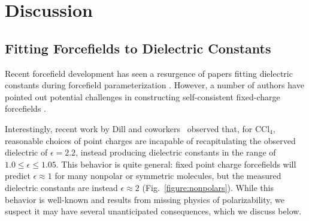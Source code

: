 \documentclass[aps,pre,twocolumn,nofootinbib,superscriptaddress,linenumbers]{revtex4-1}
\begin{document}

\section{Discussion}


\subsection{Fitting Forcefields to Dielectric Constants}

Recent forcefield development has seen a resurgence of papers fitting dielectric constants during forcefield parameterization \cite{wang2014building, fennell2014fixed}.  
However, a number of authors have pointed out potential challenges in constructing self-consistent fixed-charge forcefields \cite{fennell2012simple, leontyev2014polarizable}.  

Interestingly, recent work by Dill and coworkers~\cite{fennell2012simple} observed that, for $\mathrm{CCl_4}$, reasonable choices of point charges are incapable of recapitulating the observed dielectric of $\epsilon = 2.2$, instead producing dielectric constants in the range of $1.0 \le \epsilon \le 1.05$.  
This behavior is quite general: fixed point charge forcefields will predict $\epsilon \approx 1$ for many nonpolar or symmetric molecules, but the measured dielectric constants are instead $\epsilon \approx 2$ (Fig.~\ref{figure:nonpolars}).  
While this behavior is well-known and results from missing physics of polarizability, we suspect it may have several unanticipated consequences, which we discuss below.


\end{document}
